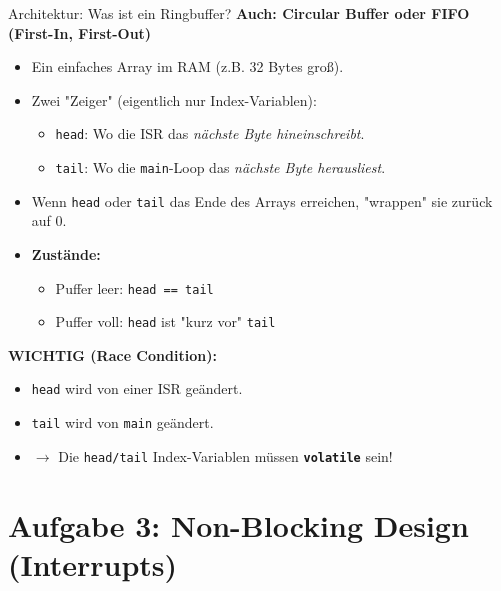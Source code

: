 \documentclass{beamer}
\begin{document}
\begin{frame}{Architektur: Was ist ein Ringbuffer?}
	\textbf{Auch: Circular Buffer oder FIFO (First-In, First-Out)}
	
	\medskip
	\begin{itemize}
		\item Ein einfaches Array im RAM (z.B. 32 Bytes groß).
		\item Zwei "Zeiger" (eigentlich nur Index-Variablen):
		\begin{itemize}
			\item \texttt{head}: Wo die ISR das \textit{nächste Byte hineinschreibt}.
			\item \texttt{tail}: Wo die \texttt{main}-Loop das \textit{nächste Byte herausliest}.
		\end{itemize}
		\item Wenn \texttt{head} oder \texttt{tail} das Ende des Arrays erreichen, "wrappen" sie zurück auf 0.
		\item \textbf{Zustände:}
		\begin{itemize}
			\item Puffer leer: \texttt{head == tail}
			\item Puffer voll: \texttt{head} ist "kurz vor" \texttt{tail}
		\end{itemize}
	\end{itemize}
	
	\medskip
	\textbf{WICHTIG (Race Condition):}
	\begin{itemize}
		\item \texttt{head} wird von einer ISR geändert.
		\item \texttt{tail} wird von \texttt{main} geändert.
		\item $\rightarrow$ Die \texttt{head/tail} Index-Variablen müssen \textbf{\texttt{volatile}} sein!
	\end{itemize}
\end{frame}
\section{Aufgabe 3: Non-Blocking Design (Interrupts)}
\end{document}

